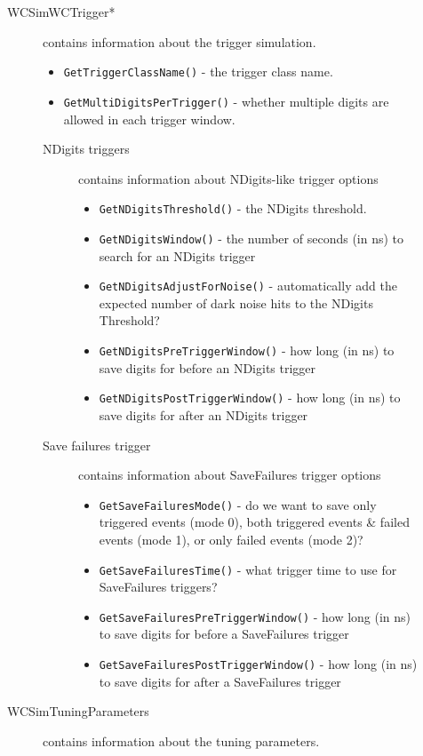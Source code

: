 \begin{description}
\begin{description}
\begin{itemize}
    \end{itemize}
  \item[WCSimWCTrigger*] contains information about the trigger simulation.
    \begin{itemize}
    \item \texttt{GetTriggerClassName()} - the trigger class name.
    \item \texttt{GetMultiDigitsPerTrigger()} - whether multiple digits are allowed in each trigger window.
    \end{itemize}
    \begin{description}
    \item[NDigits triggers] contains information about NDigits-like trigger options
      \begin{itemize}
      \item \texttt{GetNDigitsThreshold()} - the NDigits threshold.
      \item \texttt{GetNDigitsWindow()} - the number of seconds (in ns) to search for an NDigits trigger
      \item \texttt{GetNDigitsAdjustForNoise()} - automatically add the expected number of dark noise hits to the NDigits Threshold?
      \item \texttt{GetNDigitsPreTriggerWindow()} - how long (in ns) to save digits for before an NDigits trigger
      \item \texttt{GetNDigitsPostTriggerWindow()} - how long (in ns) to save digits for after an NDigits trigger
      \end{itemize}
    \item[Save failures trigger] contains information about SaveFailures trigger options
      \begin{itemize}
      \item \texttt{GetSaveFailuresMode()} - do we want to save only triggered events (mode 0), both triggered events \& failed events (mode 1), or only failed events (mode 2)?
      \item \texttt{GetSaveFailuresTime()} - what trigger time to use for SaveFailures triggers?
      \item \texttt{GetSaveFailuresPreTriggerWindow()} - how long (in ns) to save digits for before a SaveFailures trigger
      \item \texttt{GetSaveFailuresPostTriggerWindow()} - how long (in ns) to save digits for after a SaveFailures trigger
      \end{itemize}
    \end{description}
  \item[WCSimTuningParameters] contains information about the tuning parameters.

\end{description}
\end{description}

